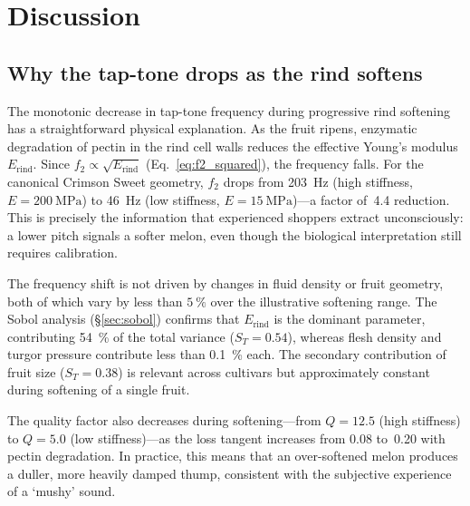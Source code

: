 \section{Discussion}
\label{sec:discussion}

\subsection{Why the tap-tone drops as the rind softens}
\label{sec:physical_interp}

The monotonic decrease in tap-tone frequency during progressive rind softening
has a straightforward physical
explanation.  As the fruit ripens, enzymatic degradation of pectin in the
rind cell walls reduces the effective Young's modulus
$E_{\mathrm{rind}}$.  Since $f_2 \propto \sqrt{E_{\mathrm{rind}}}$
(Eq.~\ref{eq:f2_squared}), the frequency falls.  For the canonical
Crimson Sweet geometry, $f_2$ drops from \SI{203}{\hertz} (high
stiffness, $E = \SI{200}{\mega\pascal}$) to \SI{46}{\hertz} (low
stiffness, $E = \SI{15}{\mega\pascal}$)---a factor of~4.4 reduction.
This is precisely the information that experienced shoppers extract
unconsciously: a lower pitch signals a softer melon, even though the
biological interpretation still requires calibration.

The frequency shift is not driven by changes in fluid density or fruit
geometry, both of which vary by less than $\SI{5}{\percent}$ over the
illustrative softening range.  The Sobol analysis (\S\ref{sec:sobol}) confirms that
$E_{\mathrm{rind}}$ is the dominant parameter, contributing
\SI{54}{\percent} of the total variance ($S_T = 0.54$), whereas flesh
density and turgor pressure contribute less than \SI{0.1}{\percent}
each.  The secondary contribution of fruit size ($S_T = 0.38$) is
relevant across cultivars but approximately constant during softening of
a single fruit.

The quality factor also decreases during softening---from $Q = 12.5$
(high stiffness) to $Q = 5.0$ (low stiffness)---as the loss tangent increases from
0.08 to~0.20 with pectin degradation.  In practice, this means that an
over-softened melon produces a duller, more heavily damped thump, consistent
with the subjective experience of a `mushy' sound.

